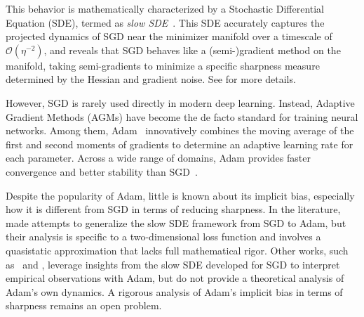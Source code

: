 This behavior is mathematically characterized by a Stochastic Differential Equation (SDE), termed as {\it slow SDE}~\citep{gu2023and}. This SDE accurately captures the projected dynamics of SGD near the minimizer manifold over a timescale of $\mathcal{O}(\eta^{-2})$, and reveals that SGD behaves like a (semi-)gradient method on the manifold, taking semi-gradients to minimize a specific sharpness measure determined by the Hessian and gradient noise. See  for more details.





However, SGD is rarely used directly in modern deep learning.
Instead, Adaptive Gradient Methods (AGMs) have become the de facto standard for training neural networks. Among them, Adam~\citep{kingma2014adam} innovatively combines the moving average of the first and second moments of gradients to determine an adaptive learning rate for each parameter. Across a wide range of domains, Adam provides faster convergence and better stability than SGD~\citep{ashish2017attention,dosovitskiy2020image,schulman2017proximal,zhang2024transformersneedadamhessian}.

Despite the popularity of Adam, little is known about its implicit bias, especially how it is different from SGD in terms of reducing sharpness.
In the literature, \citet{ma2023a} made attempts to generalize the slow SDE framework from SGD to Adam, but their analysis is specific to a two-dimensional loss function and 
involves a quasistatic approximation that lacks full mathematical rigor.
Other works, such as~\citet{liu2022pretraininglossbetterdownstream} and \citet{gu2024a}, leverage insights from the slow SDE developed for SGD to interpret empirical observations with Adam, but do not provide a theoretical analysis of Adam's own dynamics. A rigorous analysis of Adam's implicit bias in terms of sharpness remains an open problem.

